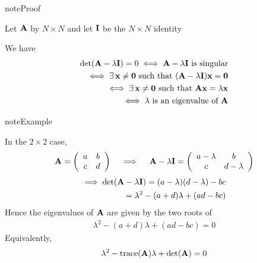 \documentclass[letterpaper,10pt,english]{jupyterBook}
\begin{document}
\begin{sphinxadmonition}{note}{Proof}

\sphinxAtStartPar
Let \({\bf A}\) by \(N \times N\) and let \({\bf I}\) be the \(N \times N\)
identity

\sphinxAtStartPar
We have
\begin{equation*}
\begin{split}
%
\det({\bf A} - \lambda {\bf I}) = 0
\iff {\bf A} - \lambda {\bf I} \text{ is singular}
\\
\iff \exists \, {\bf x} \ne {\bf 0} \text{ such that }
({\bf A} - \lambda {\bf I}) {\bf x} = {\bf 0}
\\
\iff \exists \, {\bf x} \ne {\bf 0} \text{ such that }
{\bf A} {\bf x} = \lambda {\bf x}
\\
\iff \lambda 
\text{ is an eigenvalue of } {\bf A}
%
\end{split}
\end{equation*}\end{sphinxadmonition}

\begin{sphinxadmonition}{note}{Example}

\sphinxAtStartPar
In the \(2 \times 2\) case,
\begin{equation*}
\begin{split}
%
{\bf A} =
\left(
\begin{array}{cc}
a & b \\
c & d \\
\end{array}
\right)
\quad \implies \quad
{\bf A} - \lambda {\bf I} =
\left(
\begin{array}{cc}
a - \lambda & b \\
c & d - \lambda 
\end{array}
\right)
%
\end{split}
\end{equation*}\begin{equation*}
\begin{split}
%
\implies
\det({\bf A} - \lambda {\bf I}) 
= (a - \lambda)(d - \lambda) - bc
\\
= \lambda^2 - (a + d) \lambda + (ad - bc)
%
\end{split}
\end{equation*}
\sphinxAtStartPar
Hence the eigenvalues of \({\bf A}\) are given by the two roots of
\begin{equation*}
\begin{split}
%
\lambda^2 - (a + d) \lambda + (ad - bc) = 0
%
\end{split}
\end{equation*}
\sphinxAtStartPar
Equivalently,
\begin{equation*}
\begin{split}
%
\lambda^2 - \mathrm{trace}({\bf A}) \lambda + \det({\bf A}) = 0
%
\end{split}
\end{equation*}\end{sphinxadmonition}
\end{document}
